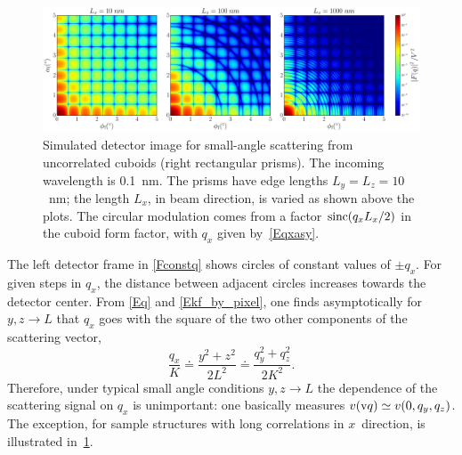 \begin{figure}[t]
\begin{center}
\includegraphics[width=1\textwidth]{fig/ff2/ff_det_box.pdf}
\end{center}
\caption{Simulated detector image for small-angle scattering from
uncorrelated cuboids (right rectangular prisms).
The incoming wavelength is 0.1~nm.
The prisms have edge lengths $L_y=L_z=10$~nm;
the length $L_x$, in beam direction, is varied as shown above the plots.
%
The circular modulation comes from a factor $\operatorname{sinc}(q_x L_x/2)$
in the cuboid form factor, with $q_x$ given by~\cref{Eqxasy}.}
\label{Fdetbox}
\end{figure}

The left detector frame in \cref{Fconstq}
shows circles of constant values of $\pm q_x$.
For given steps in $q_x$, the distance between adjacent circles
increases towards the detector center.
From \cref{Eq} and \cref{Ekf_by_pixel},
one finds asymptotically for $y,z\to L$
that $q_x$ goes with the square of the two other components of the scattering vector,
\begin{equation}\label{Eqxasy}
  \frac{q_x}{K}
  \doteq \frac{y^2+z^2}{2 L^2}
  \doteq \frac{q_y^2 + q_z^2}{2K^2}.
\end{equation}
Therefore, under typical small angle conditions $y,z\to L$
the dependence of the scattering signal on $q_x$ is unimportant:
one basically measures $v(\text{v}{q})\simeq v(0,q_y,q_z)$.
The exception, for sample structures with long correlations in $x$~direction,
is illustrated in~\cref{Fdetbox}.

